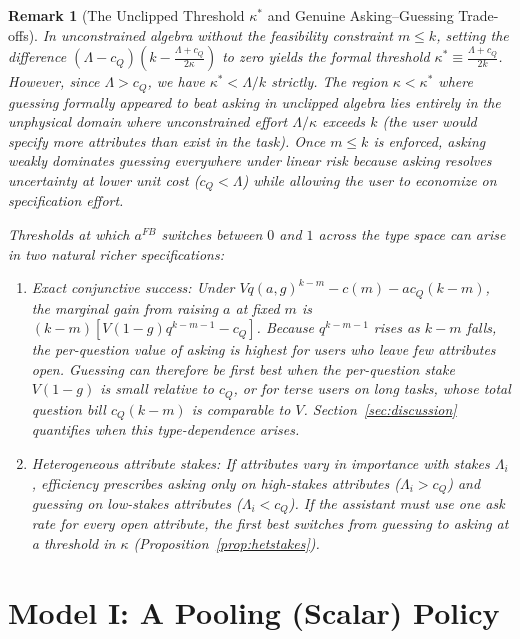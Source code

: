 \documentclass[11pt]{article}
\newtheorem{remark}{Remark}
\begin{document}
\begin{remark}[The Unclipped Threshold $\kappa^*$ and Genuine Asking--Guessing Trade-offs]
\label{rmk:kappa-star}
In unconstrained algebra without the feasibility constraint $m \le k$, setting the difference $(\Lambda - c_Q)(k - \frac{\Lambda + c_Q}{2\kappa})$ to zero yields the formal threshold $\kappa^* \equiv \frac{\Lambda + c_Q}{2k}$. However, since $\Lambda > c_Q$, we have $\kappa^* < \Lambda/k$ strictly. The region $\kappa < \kappa^*$ where guessing formally appeared to beat asking in unclipped algebra lies entirely in the unphysical domain where unconstrained effort $\Lambda/\kappa$ exceeds $k$ (the user would specify more attributes than exist in the task). Once $m \le k$ is enforced, asking weakly dominates guessing everywhere under linear risk because asking resolves uncertainty at lower unit cost ($c_Q < \Lambda$) while allowing the user to economize on specification effort.

Thresholds at which $a^{FB}$ switches between $0$ and $1$ across the type space can arise in two natural richer specifications:
\begin{enumerate}[leftmargin=*]
\item \emph{Exact conjunctive success:} Under $V q(a,g)^{k-m} - c(m) - a c_Q (k-m)$, the marginal gain from raising $a$ at fixed $m$ is $(k-m)[V(1-g)q^{k-m-1} - c_Q]$. Because $q^{k-m-1}$ rises as $k - m$ falls, the per-question value of asking is \emph{highest} for users who leave few attributes open. Guessing can therefore be first best when the per-question stake $V(1-g)$ is small relative to $c_Q$, or for terse users on long tasks, whose total question bill $c_Q(k-m)$ is comparable to $V$. Section~\ref{sec:discussion} quantifies when this type-dependence arises.
\item \emph{Heterogeneous attribute stakes:} If attributes vary in importance with stakes $\Lambda_i$, efficiency prescribes asking only on high-stakes attributes ($\Lambda_i > c_Q$) and guessing on low-stakes attributes ($\Lambda_i < c_Q$). If the assistant must use one ask rate for every open attribute, the first best switches from guessing to asking at a threshold in $\kappa$ (Proposition~\ref{prop:hetstakes}).
\end{enumerate}
\end{remark}

\section{Model I: A Pooling (Scalar) Policy}
\label{sec:model1}
\end{document}
